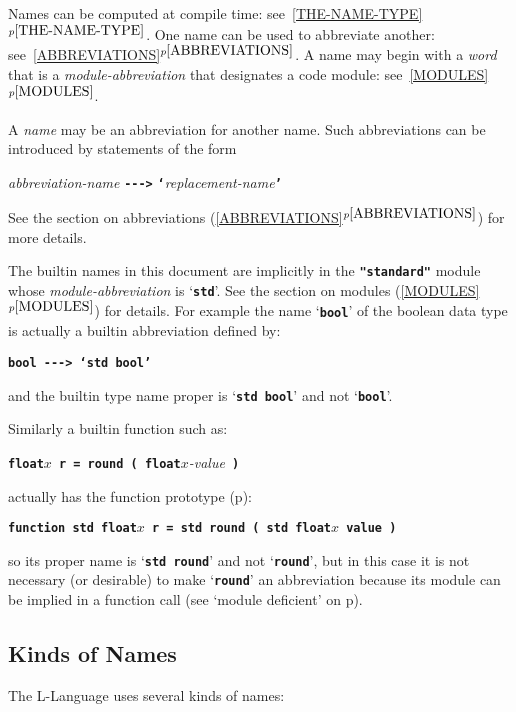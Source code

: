\documentclass[12pt]{article}
\newcommand{\TT}[1]{{\tt \bfseries #1}}
\newcommand{\itemref}[1]{\ref{#1}$^{p\pageref{#1}}$}
\newcommand{\pagref}[1]{p\pageref{#1}}
\newcommand{\ABV}{-{}-{}->}		%
\begin{document}
Names can be computed at compile time:
see~\itemref{THE-NAME-TYPE}.
One name can be used to abbreviate another:
see~\itemref{ABBREVIATIONS}.
A name may begin with a {\em word} that is a {\em module-abbreviation}
that designates a code module: see~\itemref{MODULES}.

A {\em name} may be an abbreviation for another name.  Such abbreviations
can be introduced by statements of the form
\begin{center}
{\em abbreviation-name} \TT{\ABV} \TT{`}{\em replacement-name}\TT{'}
\end{center}
See the section on abbreviations
(\itemref{ABBREVIATIONS})
for more details.

The builtin names in this document are implicitly in the
\TT{"standard"} module whose {\em module-abbreviation} is `\TT{std}'.
See the section on modules (\itemref{MODULES}) for details.
For example the name `\TT{bool}' of the boolean data type is actually a builtin
abbreviation defined by:
\begin{center}
\TT{bool {\ABV} `std bool'}
\end{center}
and the builtin type name proper is `\TT{std bool}' and not `\TT{bool}'.

Similarly a builtin function such as:
\begin{center}
\TT{float$x$ r = round ( float$x$}{\em -value}\TT{ )} \\
\end{center}
actually has the function prototype (\pagref{FUNCTION-PROTOTYPE}):
\begin{center}
\TT{function std float$x$ r = std round ( std float$x$ value )} \\
\end{center}
so its proper name is `\TT{std round}' and not `\TT{round}',
but in this case it is not necessary (or desirable) to make `\TT{round}'
an abbreviation because its module can be implied in a function call
(see `module deficient' on \pagref{MODULE-DEFICIENT}).

\subsection{Kinds of Names}

The L-Language uses several kinds of names:
\end{document}
